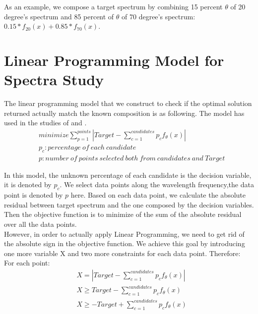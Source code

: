As an example, we compose a target spectrum by combining 15 percent $\theta$ of 20 degree's spectrum and 85 percent of $\theta$ of 70 degree's spectrum: $0.15*f_{20}(x) + 0.85*f_{70}(x)$. \\

\section{Linear Programming Model for Spectra Study}

The linear programming model that we construct to check if the optimal solution returned actually match the known composition is as following. The model has used in the studies of \cite{03}  and \cite{04}. \\
\begin{eqnarray}
& minimize \displaystyle\sum^{points}_{p=1} \left| Target- \displaystyle\sum^{candidates}_{c=1}p_{c}f_{\theta}(x) \right| \nonumber \\
& p_c: percentage ~of~ each~ candidate \nonumber \\
& p: number~ of~ points~ selected~ both~ from~ candidates~ and~ Target \nonumber 
\end{eqnarray}
 
In this model, the unknown percentage of each candidate is the decision variable, it is denoted by $p_c$. We select data points along the wavelength frequency,the data point is denoted by $p$ here. Based on each data point, we calculate the absolute residual between target spectrum and the one composed by the decision variables. Then the objective function is to minimize of the sum of the absolute residual over all the data points. \\

However, in order to actually apply Linear Programming, we need to get rid of the absolute sign in the objective function. We achieve this goal by introducing one more variable X and two more constraints for each data point. Therefore:\\

For each point:
\begin{eqnarray} 
& X = \left| Target-\displaystyle\sum^{candidates}_{c=1}p_{c}f_{\theta}(x) \right| \nonumber \\
&  X \geq Target-\displaystyle\sum^{candidates}_{c=1}p_{c}f_{\theta}(x)   \nonumber \\
& X \geq -Target+\displaystyle\sum^{candidates}_{c=1}p_{c}f_{\theta}(x)  \nonumber
\end{eqnarray} 


